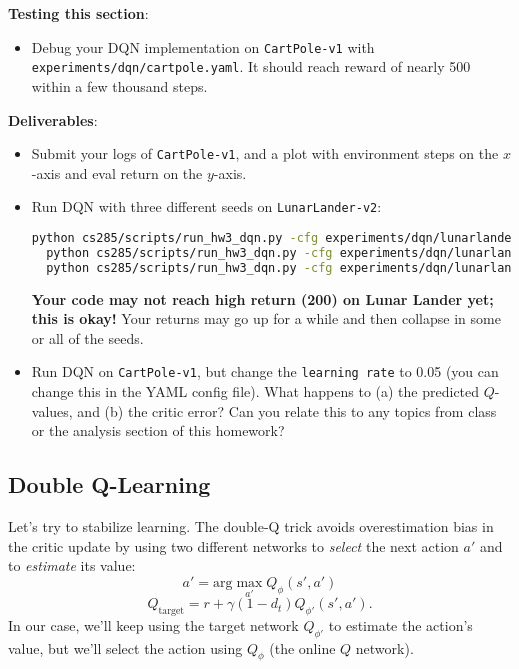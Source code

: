\textbf{Testing this section}:
\begin{itemize}
    \item Debug your DQN implementation on \verb|CartPole-v1| with \verb|experiments/dqn/cartpole.yaml|. It should reach reward of nearly 500 within a few thousand steps.
\end{itemize}

\textbf{Deliverables}:
\begin{itemize}
    \item Submit your logs of \verb|CartPole-v1|, and a plot with environment steps on the $x$-axis and eval return on the $y$-axis.
    
\MYSOLUTION



    \item Run DQN with three different seeds on \verb|LunarLander-v2|:
\begin{lstlisting}[language=bash,breaklines=true]
  python cs285/scripts/run_hw3_dqn.py -cfg experiments/dqn/lunarlander.yaml --seed 1
  python cs285/scripts/run_hw3_dqn.py -cfg experiments/dqn/lunarlander.yaml --seed 2
  python cs285/scripts/run_hw3_dqn.py -cfg experiments/dqn/lunarlander.yaml --seed 3
\end{lstlisting}
\textbf{Your code may not reach high return (200) on Lunar Lander yet; this is okay!} Your returns may go up for a while and then collapse in some or all of the seeds.
    \item Run DQN on \verb|CartPole-v1|, but change the \verb|learning rate| to 0.05 (you can change this in the YAML config file). What happens to (a) the predicted $Q$-values, and (b) the critic error? Can you relate this to any topics from class or the analysis section of this homework?
\end{itemize}

\subsection{Double Q-Learning}
Let's try to stabilize learning. The double-Q trick avoids overestimation bias in the critic update by using two different networks to \textit{select} the next action $a'$ and to \textit{estimate} its value:
\[a' = \textrm{arg}\max_{a'} Q_{\phi}(s', a')\]
\[Q_{\textrm{target}} = r + \gamma(1-d_t) Q_{\phi'}(s', a').\]
In our case, we'll keep using the target network $Q_{\phi'}$ to estimate the action's value, but we'll select the action using $Q_{\phi}$ (the online $Q$ network).

